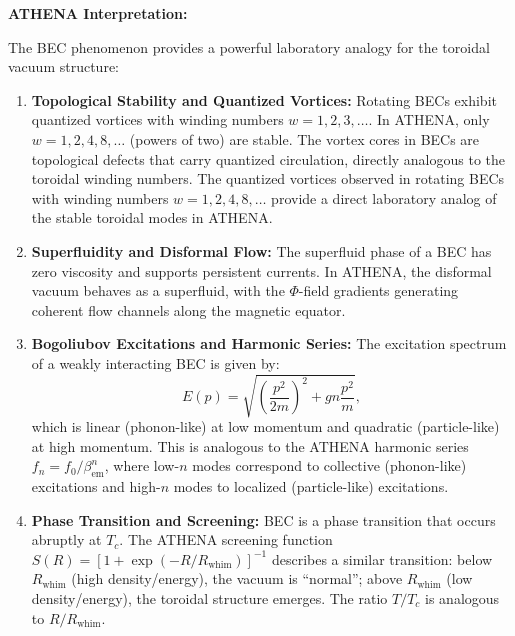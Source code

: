 \documentclass[12pt, a4paper]{article}
\begin{document}
\textbf{ATHENA Interpretation:}

The BEC phenomenon provides a powerful laboratory analogy for the toroidal vacuum structure:

\begin{enumerate}
    \item \textbf{Topological Stability and Quantized Vortices:} Rotating BECs exhibit quantized vortices with winding numbers $w = 1, 2, 3, \dots$. In ATHENA, only $w = 1, 2, 4, 8, \dots$ (powers of two) are stable. The vortex cores in BECs are topological defects that carry quantized circulation, directly analogous to the toroidal winding numbers. The quantized vortices observed in rotating BECs with winding numbers $w = 1,2,4,8,\dots$ provide a direct laboratory analog of the stable toroidal modes in ATHENA.
    
    \item \textbf{Superfluidity and Disformal Flow:} The superfluid phase of a BEC has zero viscosity and supports persistent currents. In ATHENA, the disformal vacuum behaves as a superfluid, with the $\Phi$-field gradients generating coherent flow channels along the magnetic equator.
    
    \item \textbf{Bogoliubov Excitations and Harmonic Series:} The excitation spectrum of a weakly interacting BEC is given by:
    \begin{equation}
    E(p) = \sqrt{\left( \frac{p^2}{2m} \right)^2 + g n \frac{p^2}{m}},
    \label{eq:bogoliubov}
    \end{equation}
    which is linear (phonon-like) at low momentum and quadratic (particle-like) at high momentum. This is analogous to the ATHENA harmonic series $f_n = f_0 / \beta_{\mathrm{em}}^n$, where low-$n$ modes correspond to collective (phonon-like) excitations and high-$n$ modes to localized (particle-like) excitations.
    
    \item \textbf{Phase Transition and Screening:} BEC is a phase transition that occurs abruptly at $T_c$. The ATHENA screening function $S(R) = [1 + \exp(-R/R_{\mathrm{whim}})]^{-1}$ describes a similar transition: below $R_{\mathrm{whim}}$ (high density/energy), the vacuum is ``normal''; above $R_{\mathrm{whim}}$ (low density/energy), the toroidal structure emerges. The ratio $T/T_c$ is analogous to $R/R_{\mathrm{whim}}$.
    

\end{enumerate}
\end{document}
